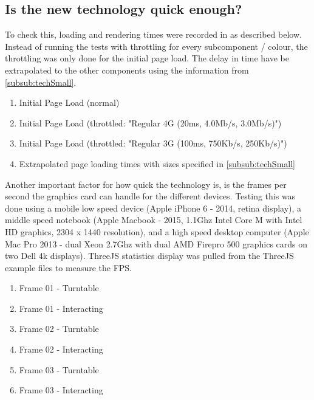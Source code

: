 
\subsection{Is the new technology quick enough?}
To check this, loading and rendering times were recorded in as described below. Instead of running the tests with throttling for every subcomponent / colour, the throttling was only done for the initial page load. The delay in time have be extrapolated to the other components using the information from \ref{subsub:techSmall}.
​\begin{enumerate}
\item {Initial Page Load (normal)}
\item {Initial Page Load (throttled: "Regular 4G (20ms, 4.0Mb/s, 3.0Mb/s)")}
\item {Initial Page Load (throttled: "Regular 3G (100ms, 750Kb/s, 250Kb/s)")}
\item {Extrapolated page loading times with sizes specified in \ref{subsub:techSmall}}
\end{enumerate}

Another important factor for how quick the technology is, is the frames per second the graphics card can handle for the different devices. Testing this was done using a mobile low speed device (Apple iPhone 6 - 2014, retina display), a middle speed notebook (Apple Macbook - 2015, 1.1Ghz Intel Core M with Intel HD graphics, 2304 x 1440 resolution), and a high speed desktop computer (Apple Mac Pro 2013 - dual Xeon 2.7Ghz with dual AMD Firepro 500 graphics cards on two Dell 4k displays). ThreeJS statistics display was pulled from the ThreeJS example files to measure the FPS.
​\begin{enumerate}
\item {Frame 01 - Turntable}
\item {Frame 01 - Interacting}
\item {Frame 02 - Turntable}
\item {Frame 02 - Interacting}
\item {Frame 03 - Turntable}
\item {Frame 03 - Interacting}
\end{enumerate}


